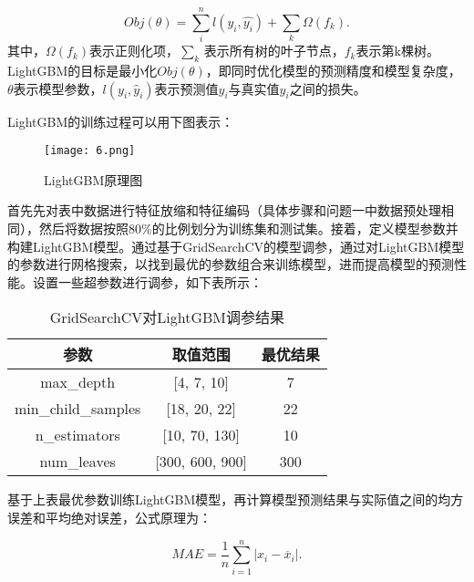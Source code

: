 \begin{equation}
    Obj(\theta )=\sum\limits_{i}^{n}{l({{y}_{i}},\widehat{{{y}_{i}}})}+\sum\limits_{k}{\Omega }({{f}_{k}}). 
\end{equation}
其中，$\Omega ({{f}_{k}})$表示正则化项，$\underset{k}{\mathop{\sum }}\,$表示所有树的叶子节点，${{f}_{k}}$表示第k棵树。LightGBM的目标是最小化$Obj(\theta )$，即同时优化模型的预测精度和模型复杂度，$\theta$表示模型参数，$l\left( {{y}_{i}},{{\widehat{y}}_{i}} \right)$表示预测值${{\widehat{y}}_{i}}$与真实值${{y}_{i}}$之间的损失。



LightGBM的训练过程可以用下图表示：

\begin{figure}[H] %
	\centering %
	\texttt{[image: 6.png]} 
	\caption{LightGBM原理图} 
	\label{Fig.main6} 
\end{figure}

首先先对表中数据进行特征放缩和特征编码（具体步骤和问题一中数据预处理相同），然后将数据按照80\%的比例划分为训练集和测试集。接着，定义模型参数并构建LightGBM模型。通过基于GridSearchCV的模型调参，通过对LightGBM模型的参数进行网格搜索，以找到最优的参数组合来训练模型，进而提高模型的预测性能。设置一些超参数进行调参，如下表所示：

\begin{table}[H]
    \centering  
    \caption{GridSearchCV对LightGBM调参结果}
    \begin{tabular}{c c c}  
    	\toprule[1.5pt]  
    	参数 & 取值范围 & 最优结果 \\  
    	\midrule[1pt]    
    	max\_depth			&  [4, 7, 10]       & 7   \\
        min\_child\_samples &  [18, 20, 22]     & 22  \\ 
        n\_estimators       &  [10, 70, 130]    & 10  \\
        num\_leaves         &  [300, 600, 900]  & 300 \\
    	\toprule[1.5pt]  
    \end{tabular}  
\end{table} 

基于上表最优参数训练LightGBM模型，再计算模型预测结果与实际值之间的均方误差和平均绝对误差，公式原理为：

\begin{equation}
    MAE=\frac{1}{n}\sum\limits_{i=1}^{n}{\left| {{x}_{i}}-{{\overline{x}}_{i}} \right|}.
\end{equation}

